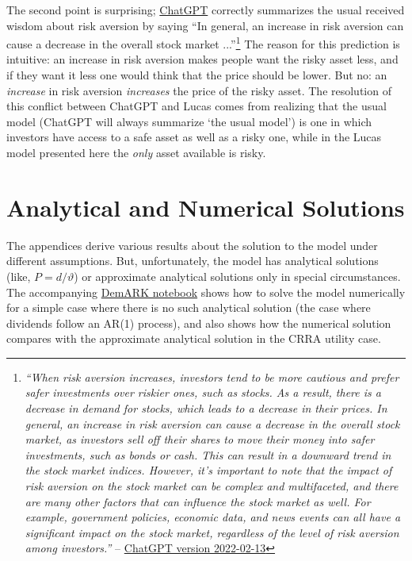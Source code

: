 \documentclass{\handout}
\begin{document}
The second point is surprising; \href{https://chat.openai.com/chat}{ChatGPT} correctly summarizes the usual received wisdom about risk aversion by saying ``In general, an increase in risk aversion can cause a decrease in the overall stock market ...''\footnote{\textit{``When risk aversion increases, investors tend to be more cautious and prefer safer investments over riskier ones, such as stocks. As a result, there is a decrease in demand for stocks, which leads to a decrease in their prices.  In general, an increase in risk aversion can cause a decrease in the overall stock market, as investors sell off their shares to move their money into safer investments, such as bonds or cash. This can result in a downward trend in the stock market indices. However, it's important to note that the impact of risk aversion on the stock market can be complex and multifaceted, and there are many other factors that can influence the stock market as well. For example, government policies, economic data, and news events can all have a significant impact on the stock market, regardless of the level of risk aversion among investors.''} -- \href{https://help.openai.com/en/articles/6825453-chatgpt-release-notes}{ChatGPT version 2022-02-13}}  The reason for this prediction is intuitive: an increase in risk aversion makes people want the risky asset less, and if they want it less one would think that the price should be lower.  But no: an \textit{increase} in risk aversion \textit{increases} the price of the risky asset.   The resolution of this conflict between ChatGPT and Lucas comes from realizing that the usual model (ChatGPT will always summarize `the usual model') is one in which investors have access to a safe asset as well as a risky one, while in the Lucas model presented here the \textit{only} asset available is risky.  

\hypertarget{analytical-and-numerical-solutions}{}
\section{Analytical and Numerical Solutions}

The appendices derive various results about the solution to the model under
different assumptions.  But, unfortunately, the model has analytical solutions
(like, $P = d/\vartheta$) or approximate analytical solutions only in special circumstances.  The accompanying
\href{https://mybinder.org/v2/gh/econ-ark/DemARK/HEAD?filepath=notebooks/Lucas-Asset-Pricing-Model.ipynb}{DemARK notebook}
shows how to solve the model numerically for a simple case where there is no
such analytical solution (the case where dividends follow an AR(1) process), and also shows
how the numerical solution compares with the approximate analytical solution in the CRRA utility case.
\end{document}
